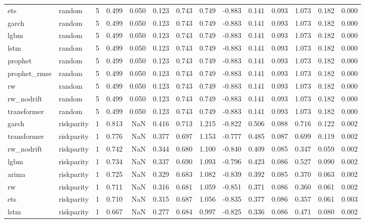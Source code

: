 \begin{table}
\begin{tabular}{llrrrrrrrrrrrr}
ets & random & 5 & 0.499 & 0.050 & 0.123 & 0.743 & 0.749 & -0.883 & 0.141 & 0.093 & 1.073 & 0.182 & 0.000 \\
garch & random & 5 & 0.499 & 0.050 & 0.123 & 0.743 & 0.749 & -0.883 & 0.141 & 0.093 & 1.073 & 0.182 & 0.000 \\
lgbm & random & 5 & 0.499 & 0.050 & 0.123 & 0.743 & 0.749 & -0.883 & 0.141 & 0.093 & 1.073 & 0.182 & 0.000 \\
lstm & random & 5 & 0.499 & 0.050 & 0.123 & 0.743 & 0.749 & -0.883 & 0.141 & 0.093 & 1.073 & 0.182 & 0.000 \\
prophet & random & 5 & 0.499 & 0.050 & 0.123 & 0.743 & 0.749 & -0.883 & 0.141 & 0.093 & 1.073 & 0.182 & 0.000 \\
prophet\_rmse & random & 5 & 0.499 & 0.050 & 0.123 & 0.743 & 0.749 & -0.883 & 0.141 & 0.093 & 1.073 & 0.182 & 0.000 \\
rw & random & 5 & 0.499 & 0.050 & 0.123 & 0.743 & 0.749 & -0.883 & 0.141 & 0.093 & 1.073 & 0.182 & 0.000 \\
rw\_nodrift & random & 5 & 0.499 & 0.050 & 0.123 & 0.743 & 0.749 & -0.883 & 0.141 & 0.093 & 1.073 & 0.182 & 0.000 \\
transformer & random & 5 & 0.499 & 0.050 & 0.123 & 0.743 & 0.749 & -0.883 & 0.141 & 0.093 & 1.073 & 0.182 & 0.000 \\
garch & riskparity & 1 & 0.813 & NaN & 0.416 & 0.713 & 1.215 & -0.822 & 0.506 & 0.088 & 0.716 & 0.122 & 0.002 \\
transformer & riskparity & 1 & 0.776 & NaN & 0.377 & 0.697 & 1.153 & -0.777 & 0.485 & 0.087 & 0.699 & 0.119 & 0.002 \\
rw\_nodrift & riskparity & 1 & 0.742 & NaN & 0.344 & 0.680 & 1.100 & -0.840 & 0.409 & 0.085 & 0.347 & 0.059 & 0.002 \\
lgbm & riskparity & 1 & 0.734 & NaN & 0.337 & 0.690 & 1.093 & -0.796 & 0.423 & 0.086 & 0.527 & 0.090 & 0.002 \\
arima & riskparity & 1 & 0.725 & NaN & 0.329 & 0.683 & 1.082 & -0.839 & 0.392 & 0.085 & 0.370 & 0.063 & 0.002 \\
rw & riskparity & 1 & 0.711 & NaN & 0.316 & 0.681 & 1.059 & -0.851 & 0.371 & 0.086 & 0.360 & 0.061 & 0.002 \\
ets & riskparity & 1 & 0.710 & NaN & 0.315 & 0.687 & 1.056 & -0.835 & 0.377 & 0.086 & 0.357 & 0.061 & 0.003 \\
lstm & riskparity & 1 & 0.667 & NaN & 0.277 & 0.684 & 0.997 & -0.825 & 0.336 & 0.086 & 0.471 & 0.080 & 0.002 \\

\end{tabular}
\end{table}
